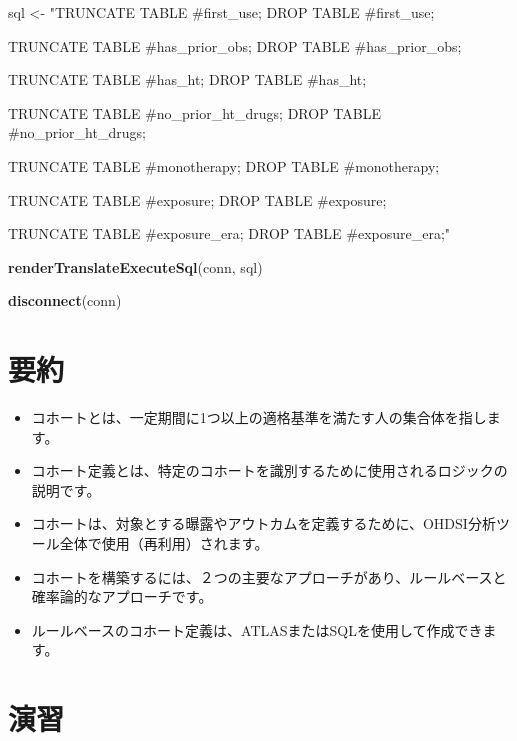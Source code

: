 \documentclass[
  11pt]{book}
\makeatletter
\newenvironment{Shaded}{\begin{snugshade}}{\end{snugshade}}
\newcommand{\FunctionTok}[1]{\textcolor[rgb]{0.13,0.29,0.53}{\textbf{#1}}}
\newcommand{\NormalTok}[1]{#1}
\newcommand{\OtherTok}[1]{\textcolor[rgb]{0.56,0.35,0.01}{#1}}
\newcommand{\StringTok}[1]{\textcolor[rgb]{0.31,0.60,0.02}{#1}}
\newenvironment{kframe}{%
\medskip{}
\setlength{\fboxsep}{.8em}
 \def\at@end@of@kframe{}%
 \ifinner\ifhmode%
  \def\at@end@of@kframe{\end{minipage}}%
  \begin{minipage}{\columnwidth}%
 \fi\fi%
 \def\FrameCommand##1{\hskip\@totalleftmargin \hskip-\fboxsep
 \colorbox{myShadeColor}{##1}\hskip-\fboxsep
     \hskip-\linewidth \hskip-\@totalleftmargin \hskip\columnwidth}%
 \MakeFramed {\advance\hsize-\width
   \@totalleftmargin\z@ \linewidth\hsize
   \@setminipage}}%
 {\par\unskip\endMakeFramed%
 \at@end@of@kframe}
\newenvironment{rmdblock}[1]
  {
  \begin{itemize}
  \renewcommand{\labelitemi}{
    \raisebox{-.7\height}[0pt][0pt]{
      {\setkeys{Gin}{width=3em,keepaspectratio}\texttt{[image: images/\#1]}}
    }
  }
  \setlength{\fboxsep}{1em}
  \begin{kframe}
  \item
  }
  {
  \end{kframe}
  \end{itemize}
  }
\newenvironment{rmdsummary}
  {\begin{rmdblock}{summary}}
  {\end{rmdblock}}
\theoremstyle{definition}
\theoremstyle{definition}
\theoremstyle{definition}
\theoremstyle{definition}
\theoremstyle{remark}
\makeatother
\begin{document}
\begin{Shaded}
\begin{Highlighting}[]
\NormalTok{sql }\OtherTok{\textless{}{-}} \StringTok{"TRUNCATE TABLE \#first\_use;}
\StringTok{DROP TABLE \#first\_use;}

\StringTok{TRUNCATE TABLE \#has\_prior\_obs;}
\StringTok{DROP TABLE \#has\_prior\_obs;}

\StringTok{TRUNCATE TABLE \#has\_ht;}
\StringTok{DROP TABLE \#has\_ht;}

\StringTok{TRUNCATE TABLE \#no\_prior\_ht\_drugs;}
\StringTok{DROP TABLE \#no\_prior\_ht\_drugs;}

\StringTok{TRUNCATE TABLE \#monotherapy;}
\StringTok{DROP TABLE \#monotherapy;}

\StringTok{TRUNCATE TABLE \#exposure;}
\StringTok{DROP TABLE \#exposure;}

\StringTok{TRUNCATE TABLE \#exposure\_era;}
\StringTok{DROP TABLE \#exposure\_era;"}

\FunctionTok{renderTranslateExecuteSql}\NormalTok{(conn, sql)}

\FunctionTok{disconnect}\NormalTok{(conn)}
\end{Highlighting}
\end{Shaded}

\section{要約}\label{ux8981ux7d04}

\begin{rmdsummary}
\begin{itemize}
\item
  コホートとは、一定期間に1つ以上の適格基準を満たす人の集合体を指します。
\item
  コホート定義とは、特定のコホートを識別するために使用されるロジックの説明です。
\item
  コホートは、対象とする曝露やアウトカムを定義するために、OHDSI分析ツール全体で使用（再利用）されます。
\item
  コホートを構築するには、２つの主要なアプローチがあり、ルールベースと確率論的なアプローチです。
\item
  ルールベースのコホート定義は、ATLASまたはSQLを使用して作成できます。
\end{itemize}
\end{rmdsummary}

\section{演習}\label{ux6f14ux7fd2-5}
\end{document}

